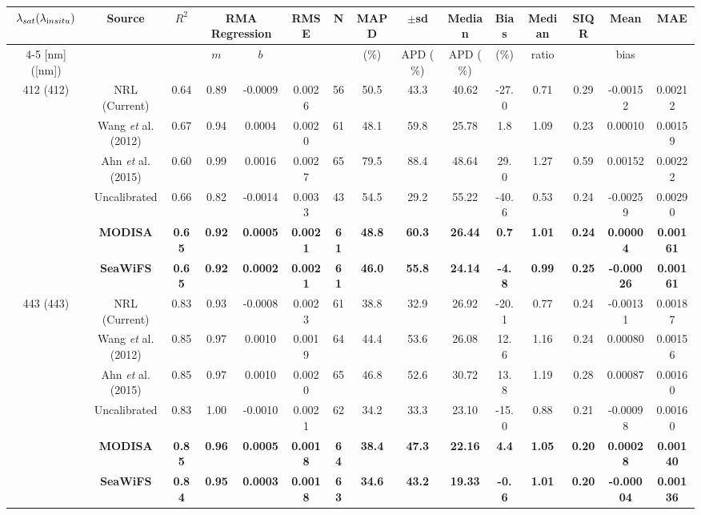 \documentclass[preview]{standalone}
\begin{document}
\centering
\begin{tabular}{ccccccccccccccc} 
 \hline 
$\lambda_{sat} (\lambda_{\text in situ})$ & Source & $R^2$ & \multicolumn{2}{c}{RMA Regression} & RMSE & N & MAPD & $\pm$sd & Median & Bias & Median & SIQR & Mean & MAE\\ \cline{4-5}
[nm]([nm])                  &              &         & $m$     & $b$     &             &     & ($\%$)  & APD ($\%$)  & APD ($\%$)  & ($\%$)   & ratio   &  & bias&       \\ \hline 
 \hline  


\multirow{6}{*}{412 (412)} 	& NRL (Current) 			& 0.64 & 0.89 & -0.0009 & 0.0026 & 56 & 50.5 & 43.3 & 40.62 & -27.0 & 0.71 & 0.29 & -0.00152 & 0.00212 \\
							& Wang {\it et} al. (2012) 	& 0.67 & 0.94 & 0.0004 & 0.0020 & 61 & 48.1 & 59.8 & 25.78 & 1.8 & 1.09 & 0.23 & 0.00010 & 0.00159 \\
							& Ahn {\it et} al. (2015) 	& 0.60 & 0.99 & 0.0016 & 0.0027 & 65 & 79.5 & 88.4 & 48.64 & 29.0 & 1.27 & 0.59 & 0.00152 & 0.00222 \\
							& Uncalibrated 				& 0.66 & 0.82 & -0.0014 & 0.0033 & 43 & 54.5 & 29.2 & 55.22 & -40.6 & 0.53 & 0.24 & -0.00259 & 0.00290 \\
							& {\bf MODISA} 				& {\bf 0.65} & {\bf 0.92} & {\bf 0.0005} & {\bf 0.0021} & {\bf 61} & {\bf 48.8} & {\bf 60.3} & {\bf 26.44} & {\bf 0.7} & {\bf 1.01} & {\bf 0.24} & {\bf 0.00004} & {\bf 0.00161} \\
							& {\bf SeaWiFS} 			& {\bf 0.65} & {\bf 0.92} & {\bf 0.0002} & {\bf 0.0021} & {\bf 61} & {\bf 46.0} & {\bf 55.8} & {\bf 24.14} & {\bf -4.8} & {\bf 0.99} & {\bf 0.25} & {\bf -0.00026} & {\bf 0.00161} \\ \hline

\multirow{6}{*}{443 (443)}  & NRL (Current) 			& 0.83 & 0.93 & -0.0008 & 0.0023 & 61 & 38.8 & 32.9 & 26.92 & -20.1 & 0.77 & 0.24 & -0.00131 & 0.00187 \\
							& Wang {\it et} al. (2012) 	& 0.85 & 0.97 & 0.0010 & 0.0019 & 64 & 44.4 & 53.6 & 26.08 & 12.6 & 1.16 & 0.24 & 0.00080 & 0.00156 \\
							& Ahn {\it et} al. (2015) 	& 0.85 & 0.97 & 0.0010 & 0.0020 & 65 & 46.8 & 52.6 & 30.72 & 13.8 & 1.19 & 0.28 & 0.00087 & 0.00160 \\
							& Uncalibrated 				& 0.83 & 1.00 & -0.0010 & 0.0021 & 62 & 34.2 & 33.3 & 23.10 & -15.0 & 0.88 & 0.21 & -0.00098 & 0.00160 \\
							& {\bf MODISA} 				& {\bf 0.85} & {\bf 0.96} & {\bf 0.0005} & {\bf 0.0018} & {\bf 64} & {\bf 38.4} & {\bf 47.3} & {\bf 22.16} & {\bf 4.4} & {\bf 1.05} & {\bf 0.20} & {\bf 0.00028} & {\bf 0.00140} \\
							& {\bf SeaWiFS} 			& {\bf 0.84} & {\bf 0.95} & {\bf 0.0003} & {\bf 0.0018} & {\bf 63} & {\bf 34.6} & {\bf 43.2} & {\bf 19.33} & {\bf -0.6} & {\bf 1.01} & {\bf 0.20} & {\bf -0.00004} & {\bf 0.00136} \\ \hline


\end{tabular}
\end{document}
